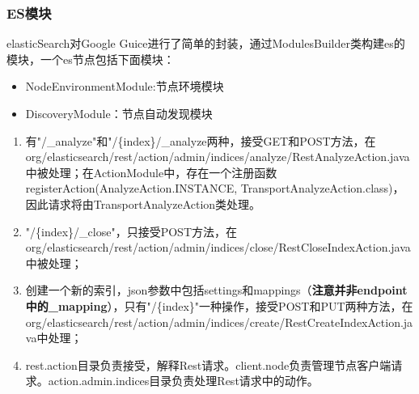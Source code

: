 \subsubsection{ES模块}
\par elasticSearch对Google Guice进行了简单的封装，通过ModulesBuilder类构建es的模块，一个es节点包括下面模块：
\begin{itemize}
\item NodeEnvironmentModule:节点环境模块
\item DiscoveryModule：节点自动发现模块
\end{itemize}

\begin{enumerate}[(1)]
\item 有"/\_analyze"和"/\{index\}/\_analyze两种，接受GET和POST方法，在org/elasticsearch/rest/action/admin/indices/analyze/RestAnalyzeAction.java中被处理；在ActionModule中，存在一个注册函数registerAction(AnalyzeAction.INSTANCE, TransportAnalyzeAction.class)，因此请求将由TransportAnalyzeAction类处理。
\item "/\{index\}/\_close"，只接受POST方法，在org/elasticsearch/rest/action/admin/indices/close/RestCloseIndexAction.java中被处理；
\item  创建一个新的索引，json参数中包括settings和mappings（\textbf{注意并非endpoint中的\_mapping}），只有"/\{index\}"一种操作，接受POST和PUT两种方法，在org/elasticsearch/rest/action/admin/indices/create/RestCreateIndexAction.java中处理；
\item rest.action目录负责接受，解释Rest请求。client.node负责管理节点客户端请求。action.admin.indices目录负责处理Rest请求中的动作。
\end{enumerate}
